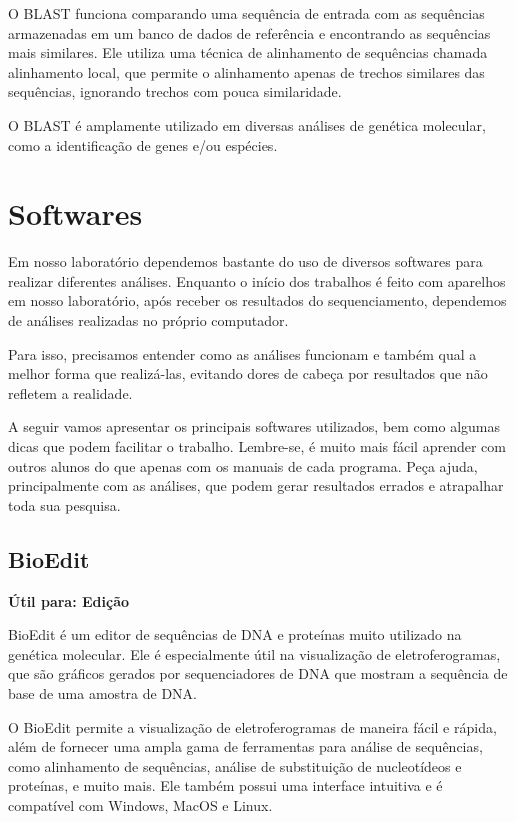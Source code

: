 \documentclass[
  letterpaper,
  DIV=11,
  numbers=noendperiod]{scrreprt}
\begin{document}
O BLAST funciona comparando uma sequência de entrada com as sequências
armazenadas em um banco de dados de referência e encontrando as
sequências mais similares. Ele utiliza uma técnica de alinhamento de
sequências chamada alinhamento local, que permite o alinhamento apenas
de trechos similares das sequências, ignorando trechos com pouca
similaridade.

O BLAST é amplamente utilizado em diversas análises de genética
molecular, como a identificação de genes e/ou espécies.

\hypertarget{softwares}{%
\chapter{Softwares}\label{softwares}}

Em nosso laboratório dependemos bastante do uso de diversos softwares
para realizar diferentes análises. Enquanto o início dos trabalhos é
feito com aparelhos em nosso laboratório, após receber os resultados do
sequenciamento, dependemos de análises realizadas no próprio computador.

Para isso, precisamos entender como as análises funcionam e também qual
a melhor forma que realizá-las, evitando dores de cabeça por resultados
que não refletem a realidade.

A seguir vamos apresentar os principais softwares utilizados, bem como
algumas dicas que podem facilitar o trabalho. Lembre-se, é muito mais
fácil aprender com outros alunos do que apenas com os manuais de cada
programa. Peça ajuda, principalmente com as análises, que podem gerar
resultados errados e atrapalhar toda sua pesquisa.

\hypertarget{bioedit}{%
\section{BioEdit}\label{bioedit}}

\textbf{Útil para: {Edição}}

BioEdit é um editor de sequências de DNA e proteínas muito utilizado na
genética molecular. Ele é especialmente útil na visualização de
eletroferogramas, que são gráficos gerados por sequenciadores de DNA que
mostram a sequência de base de uma amostra de DNA.

O BioEdit permite a visualização de eletroferogramas de maneira fácil e
rápida, além de fornecer uma ampla gama de ferramentas para análise de
sequências, como alinhamento de sequências, análise de substituição de
nucleotídeos e proteínas, e muito mais. Ele também possui uma interface
intuitiva e é compatível com Windows, MacOS e Linux.
\end{document}
